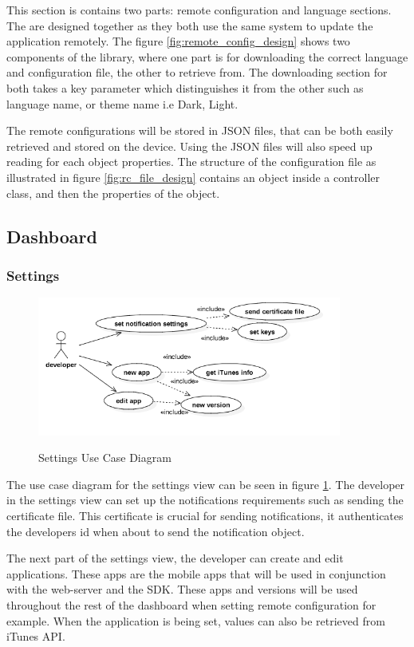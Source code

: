 This section is contains two parts: remote configuration and language sections. The are designed together as they both use the same system to update the application remotely. The figure \ref{fig:remote_config_design} shows two components of the library, where one part is for downloading the correct language and configuration file, the other to retrieve from. The downloading section for both takes a key parameter which distinguishes it from the other such as language name, or theme name i.e Dark, Light.  

The remote configurations will be stored in JSON files, that can be both easily retrieved and stored on the device. Using the JSON files will also speed up reading for each object properties. The structure of the configuration file as illustrated in figure \ref{fig:rc_file_design} contains an object inside a controller class, and then the properties of the object.

\subsection{Dashboard}

\subsubsection{Settings}

\begin{figure}[!h]
    \caption{Settings Use Case Diagram}
    \centering
    \includegraphics[width=100mm]{images/use_cases/settings_uc}
    \label{fig:settings_uc}
\end{figure}

The use case diagram for the settings view can be seen in figure \ref{fig:settings_uc}. The developer in the settings view can set up the notifications requirements such as sending the certificate file. This certificate is crucial for sending notifications, it authenticates the developers id when about to send the notification object.

The next part of the settings view, the developer can create and edit applications. These apps are the mobile apps that will be used in conjunction with the web-server and the SDK. These apps and versions will be used throughout the rest of the dashboard when setting remote configuration for example. When the application is being set, values can also be retrieved from iTunes API.

